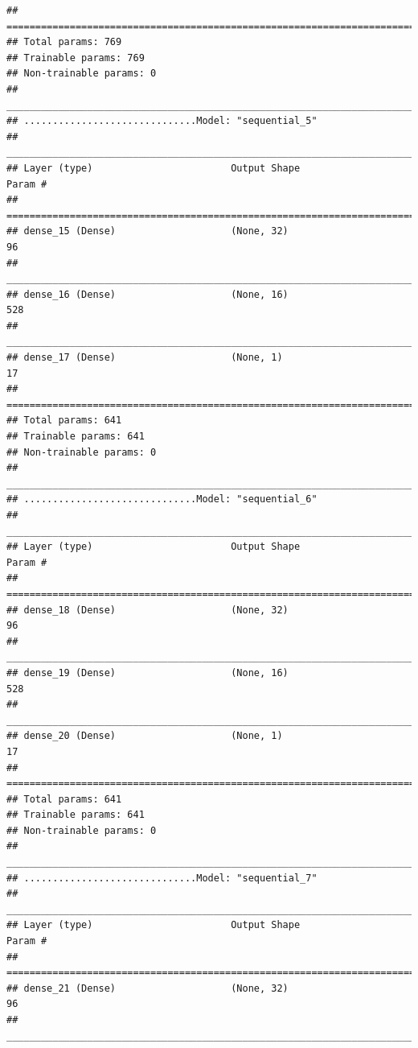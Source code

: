 \documentclass[
]{article}
\begin{document}
\begin{verbatim}
## ================================================================================
## Total params: 769
## Trainable params: 769
## Non-trainable params: 0
## ________________________________________________________________________________
## ..............................Model: "sequential_5"
## ________________________________________________________________________________
## Layer (type)                        Output Shape                    Param #     
## ================================================================================
## dense_15 (Dense)                    (None, 32)                      96          
## ________________________________________________________________________________
## dense_16 (Dense)                    (None, 16)                      528         
## ________________________________________________________________________________
## dense_17 (Dense)                    (None, 1)                       17          
## ================================================================================
## Total params: 641
## Trainable params: 641
## Non-trainable params: 0
## ________________________________________________________________________________
## ..............................Model: "sequential_6"
## ________________________________________________________________________________
## Layer (type)                        Output Shape                    Param #     
## ================================================================================
## dense_18 (Dense)                    (None, 32)                      96          
## ________________________________________________________________________________
## dense_19 (Dense)                    (None, 16)                      528         
## ________________________________________________________________________________
## dense_20 (Dense)                    (None, 1)                       17          
## ================================================================================
## Total params: 641
## Trainable params: 641
## Non-trainable params: 0
## ________________________________________________________________________________
## ..............................Model: "sequential_7"
## ________________________________________________________________________________
## Layer (type)                        Output Shape                    Param #     
## ================================================================================
## dense_21 (Dense)                    (None, 32)                      96          
## ________________________________________________________________________________

\end{verbatim}
\end{document}
